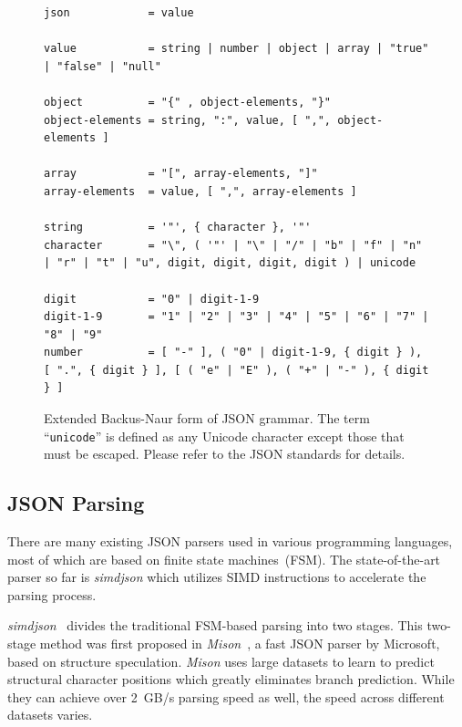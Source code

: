 \documentclass[11pt]{article}
\begin{document}
\suppressfloats  %

\begin{figure}
\lstset{language=[json]EBNF}
\begin{lstlisting}[basicstyle=\fontsize{8}{9}\tt,breaklines,numbers=none]
json            = value

value           = string | number | object | array | "true" | "false" | "null"

object          = "{" , object-elements, "}"
object-elements = string, ":", value, [ ",", object-elements ]

array           = "[", array-elements, "]"
array-elements  = value, [ ",", array-elements ]

string          = '"', { character }, '"'
character       = "\", ( '"' | "\" | "/" | "b" | "f" | "n" | "r" | "t" | "u", digit, digit, digit, digit ) | unicode

digit           = "0" | digit-1-9
digit-1-9       = "1" | "2" | "3" | "4" | "5" | "6" | "7" | "8" | "9"
number          = [ "-" ], ( "0" | digit-1-9, { digit } ), [ ".", { digit } ], [ ( "e" | "E" ), ( "+" | "-" ), { digit } ]
\end{lstlisting}
\caption{Extended Backus-Naur form of JSON grammar. The term ``\texttt{unicode}'' is defined as any Unicode character except those that must be escaped. Please refer to the JSON standards for details.}
\label{fig:ebnf-json}
\end{figure}

\subsection{JSON Parsing}

There are many existing JSON parsers used in various programming languages, most of which are based on finite state machines~(FSM). The state-of-the-art parser so far is \textit{simdjson} which utilizes SIMD instructions to accelerate the parsing process.

\textit{simdjson}~\cite{langdale2019parsing} divides the traditional FSM-based parsing into two stages. This two-stage method was first proposed in \textit{Mison}~\cite{li2017mison}, a fast JSON parser by Microsoft, based on structure speculation.
\textit{Mison} uses large datasets to learn to predict structural character positions which greatly eliminates branch prediction. While they can achieve over \SI{2}{GB/s} parsing speed as well, the speed across different datasets varies.
\end{document}
